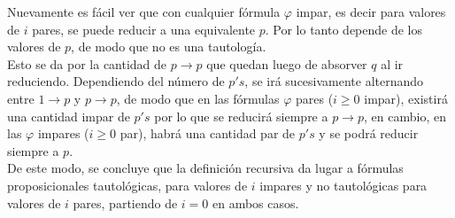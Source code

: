 \documentclass[letter]{article}
\begin{document}
\begin{pregunta}{1}
\begin{enumerate}
			Nuevamente es fácil ver que con cualquier fórmula $\varphi$ impar, es decir para valores de $i$ pares, se puede reducir a una equivalente $p$. Por lo tanto depende de los valores de $p$, de modo que no es una tautología.\\
			
			Esto se da por la cantidad de $p \rightarrow p$ que quedan luego de absorver $q$ al ir reduciendo. Dependiendo del número de $p's$, se irá sucesivamente alternando entre $1\rightarrow p$ y $p \rightarrow p$, de modo que en las fórmulas $\varphi$ pares ($i\geq 0$ impar), existirá una cantidad impar de $p's$ por lo que se reducirá siempre a $p \rightarrow p$, en cambio, en las $\varphi$ impares ($i\geq 0$ par), habrá una cantidad par de $p's$ y se podrá reducir siempre a $p$.\\
			
			De este modo, se concluye que la definición recursiva da lugar a fórmulas proposicionales tautológicas, para valores de $i$ impares y no tautológicas para valores de $i$ pares, partiendo de $i=0$ en ambos casos.

		\end{enumerate}
	\end{pregunta}
	
\end{document}
